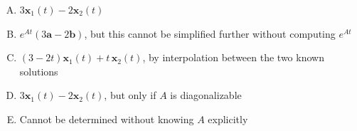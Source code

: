 \documentclass[12pt]{amsart}
\begin{document}
\begin{enumerate}[(A)]
\item $3\mathbf{x}_1(t) - 2\mathbf{x}_2(t)$
\item $e^{At}(3\mathbf{a} - 2\mathbf{b})$, but this cannot be simplified 
      further without computing $e^{At}$
\item $(3-2t)\mathbf{x}_1(t) + t\,\mathbf{x}_2(t)$, by interpolation 
      between the two known solutions
\item $3\mathbf{x}_1(t) - 2\mathbf{x}_2(t)$, but only if $A$ is diagonalizable
\item Cannot be determined without knowing $A$ explicitly
\end{enumerate}

%
%
%
%
%
%
%
%
\end{document}
